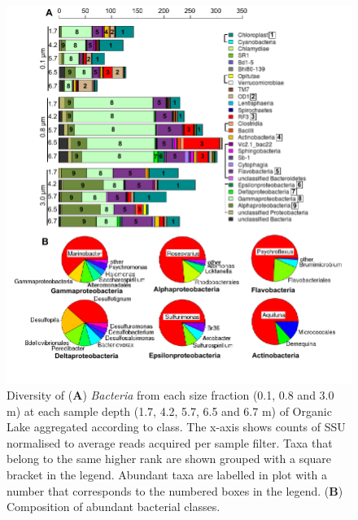\begin{figure}
\includegraphics[width=\textwidth]{orglake_figures/genus_barplots3_1.pdf}
\caption[Diversity of \emph{Bacteria} in Organic Lake]{Diversity of (\textbf{A}) \emph{Bacteria} from each size fraction (0.1, 0.8 and 3.0 \textmu{}m) at each sample depth (1.7, 4.2, 5.7, 6.5 and 6.7 m) of Organic Lake aggregated according to class. The x-axis shows counts of \ac{SSU} normalised to average reads acquired per sample filter. Taxa that belong to the same higher rank are shown grouped with a square bracket in the legend. Abundant taxa are labelled in plot with a number that corresponds to the numbered boxes in the legend. (\textbf{B}) Composition of abundant bacterial classes.}
\label{fig:genus_barplots_bact}

\end{figure}
